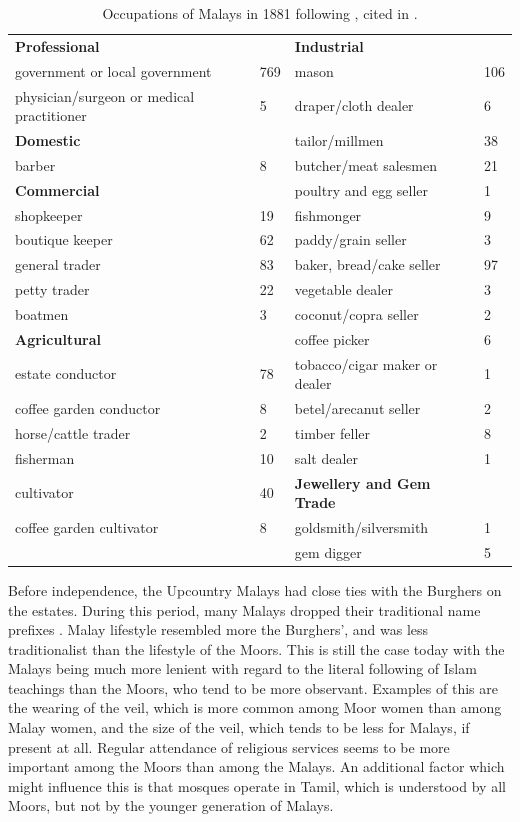 \begin{table}
\begin{tabular}{llll}
\textbf{Professional} && \textbf{Industrial}&\\
government or local government & 769 & mason & 106 \\ 
physician/surgeon or medical practitioner & 5 & draper/cloth dealer & 6 \\
\textbf{Domestic} &  & tailor/millmen & 38 \\
barber & 8 & butcher/meat salesmen & 21 \\ 
\textbf{Commercial} &   & poultry and egg seller & 1 \\
shopkeeper & 19 & fishmonger & 9 \\ 
boutique keeper & 62 & paddy/grain seller & 3 \\ 
general trader & 83 & baker, bread/cake seller & 97 \\ 
petty trader & 22 & vegetable dealer & 3 \\ 
boatmen & 3 & coconut/copra seller & 2 \\ 
\textbf{Agricultural} &  & coffee picker & 6 \\
estate conductor & 78 & tobacco/cigar maker or dealer & 1 \\ 
coffee garden conductor & 8 & betel/arecanut seller & 2 \\ 
horse/cattle trader & 2 & timber feller & 8 \\ 
fisherman & 10 & salt dealer & 1 \\ 
cultivator & 40 & \textbf{Jewellery and Gem Trade} &   \\
coffee garden cultivator & 8 & goldsmith/silversmith & 1 \\ 
  &   & gem digger & 5
\end{tabular}
\caption[Occupations of Malays in 1881]{Occupations of Malays in 1881 following \citet[51]{Marga1988}, cited in \citet[26]{Bichsel}.}
\label{tab:MalayOccupations1881}
\end{table}



Before independence, the Upcountry Malays had close ties with the Burghers on the estates. During this period, many Malays dropped their traditional name prefixes \citep{Saldin2003}. Malay lifestyle resembled more the Burghers', and was less traditionalist than the lifestyle of the Moors.  This is still the case today with the Malays being much more lenient with regard to the literal following of Islam teachings than the Moors, who tend to be more observant. Examples of this are the wearing of the veil, which is more common among Moor women than among Malay women, and the size of the veil, which tends to be less for Malays, if present at all. Regular attendance of religious services seems to be more important among the Moors than among the Malays. An additional factor which might influence this is that mosques operate in Tamil, which is understood by all Moors, but not by the younger generation of Malays.

